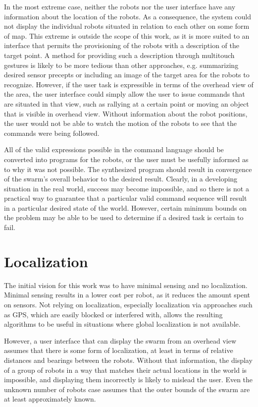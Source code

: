 In the most extreme case, neither the robots nor the user interface have any information about the location of the robots. 
As a consequence, the system could not display the individual robots situated in relation to each other on some form of map. 
This extreme is outside the scope of this work, as it is more suited to an interface that permits the provisioning of the robots with a description of the target point. 
A method for providing such a description through multitouch gestures is likely to be more tedious than other approaches, e.g. summarizing desired sensor precepts or including an image of the target area for the robots to recognize. 
However, if the user task is expressible in terms of the overhead view of the area, the user interface could simply allow the user to issue commands that are situated in that view, such as rallying at a certain point or moving an object that is visible in overhead view. 
Without information about the robot positions, the user would not be able to watch the motion of the robots to see that the commands were being followed. 

All of the valid expressions possible in the command language should be converted into programs for the robots, or the user must be usefully informed as to why it was not possible. 
The synthesized program should result in convergence of the swarm's overall behavior to the desired result. 
Clearly, in a developing situation in the real world, success may become impossible, and so there is not a practical way to guarantee that a particular valid command sequence will result in a particular desired state of the world. 
However, certain minimum bounds on the problem may be able to be used to determine if a desired task is certain to fail. 

\section{Localization}\label{sec:localization}

The initial vision for this work was to have minimal sensing and no localization. 
Minimal sensing results in a lower cost per robot, as it reduces the amount spent on sensors. 
Not relying on localization, especially localization via approaches such as GPS, which are easily blocked or interfered with, allows the resulting algorithms to be useful in situations where global localization is not available. 

However, a user interface that can display the swarm from an overhead view assumes that there is some form of localization, at least in terms of relative distances and bearings between the robots.
Without that information, the display of a group of robots in a way that matches their actual locations in the world is impossible, and displaying them incorrectly is likely to mislead the user. 
Even the unknown number of robots case assumes that the outer bounds of the swarm are at least approximately known. 

